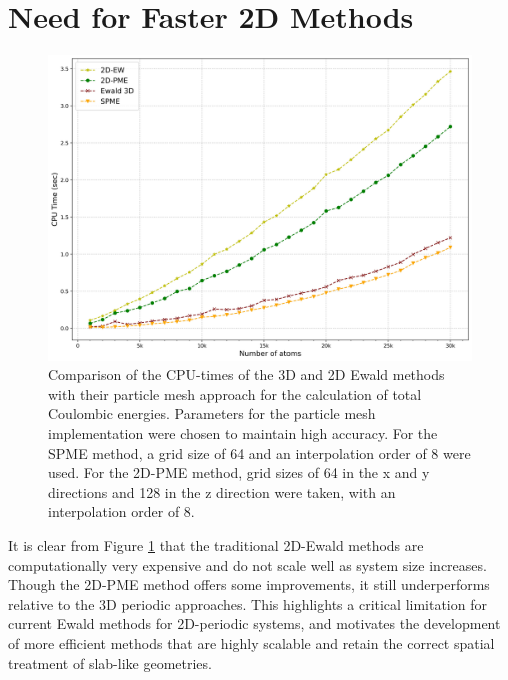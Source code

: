 \section{Need for Faster 2D Methods}
\begin{figure}[H]
    \centering
    \includegraphics[width=1\linewidth]{images/kAWATA_VS_SPME_Result30k_3DEwald.jpg}
    \caption{Comparison of the CPU-times of the 3D and 2D Ewald methods with their particle mesh approach for the calculation of total Coulombic energies. Parameters for the particle mesh implementation were chosen to maintain high accuracy. For the \ac{SPME} method, a grid size of 64 and an interpolation order of 8 were used. For the 2D-PME method, grid sizes of 64 in the x and y directions and 128 in the z direction were taken, with an interpolation order of 8.}
    \label{fig:enter-label}
\end{figure}
It is clear from Figure \ref{fig:enter-label} that the traditional 2D-Ewald methods are computationally very expensive and do not scale well as system size increases. Though the \ac{2D-PME} method offers some improvements, it still underperforms relative to the 3D periodic approaches. This highlights a critical limitation for current Ewald methods for 2D-periodic systems, and motivates the development of more efficient methods that are highly scalable and retain the correct spatial treatment of slab-like geometries. 